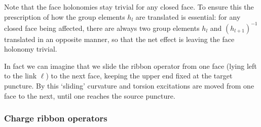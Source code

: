 \documentclass[nofootinbib,superscriptaddress,eqsecnum,tightenlines,11pt]{revtex4-1}
\begin{document}
Note that the face holonomies stay trivial for any closed face. 
To ensure this the prescription of how the group elements $h_l$ are translated is essential: for any closed face being affected, there are always two group elements  $h_l$ and $(h_{l+1})^{-1}$ translated in an opposite manner, so that the net effect is leaving the face holonomy trivial. 

In fact we can imagine that we slide the ribbon operator from one face (lying left to the link $\ell$) to the next face, keeping the upper end fixed at the target puncture.
By this `sliding'  curvature and torsion excitations are moved from one face to the next, until one reaches the source puncture. 



\subsubsection{Charge ribbon operators}
\end{document}
